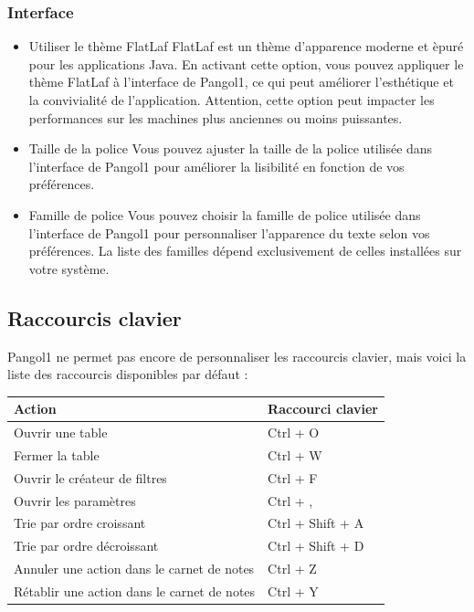 \documentclass[11pt,a4paper]{article}
\begin{document}
\subsubsection*{Interface}
\begin{itemize}
  \item Utiliser le th\`eme FlatLaf
  \newline FlatLaf est un th\`eme d'apparence moderne et \`epur\'e pour les applications Java. En activant cette option, vous pouvez appliquer le th\`eme FlatLaf \`a l'interface de Pangol1, ce qui peut am\'eliorer l'esth\'etique et la convivialit\'e de l'application. Attention, cette option peut impacter les performances sur les machines plus anciennes ou moins puissantes.
  \item Taille de la police
  \newline Vous pouvez ajuster la taille de la police utilis\'ee dans l'interface de Pangol1 pour am\'eliorer la lisibilit\'e en fonction de vos pr\'ef\'erences.
  \item Famille de police
  \newline Vous pouvez choisir la famille de police utilis\'ee dans l'interface de Pangol1 pour personnaliser l'apparence du texte selon vos pr\'ef\'erences. La liste des familles d\'epend exclusivement de celles install\'ees sur votre syst\`eme.
\end{itemize}

\subsection{Raccourcis clavier}
Pangol1 ne permet pas encore de personnaliser les raccourcis clavier, mais voici la liste des raccourcis disponibles par d\'efaut :

\begin{center}
\begin{tabularx}{0.9\linewidth}{@{}lX@{}}
\toprule
Action & Raccourci clavier \\
\midrule
Ouvrir une table & Ctrl + O \\
Fermer la table & Ctrl + W \\
Ouvrir le cr\'eateur de filtres & Ctrl + F \\
Ouvrir les param\`etres & Ctrl + , \\
Trie par ordre croissant & Ctrl + Shift + A \\
Trie par ordre d\'ecroissant & Ctrl + Shift + D \\
Annuler une action dans le carnet de notes & Ctrl + Z \\
R\'etablir une action dans le carnet de notes & Ctrl + Y \\
\bottomrule
\end{tabularx}
\end{center}
\end{document}

